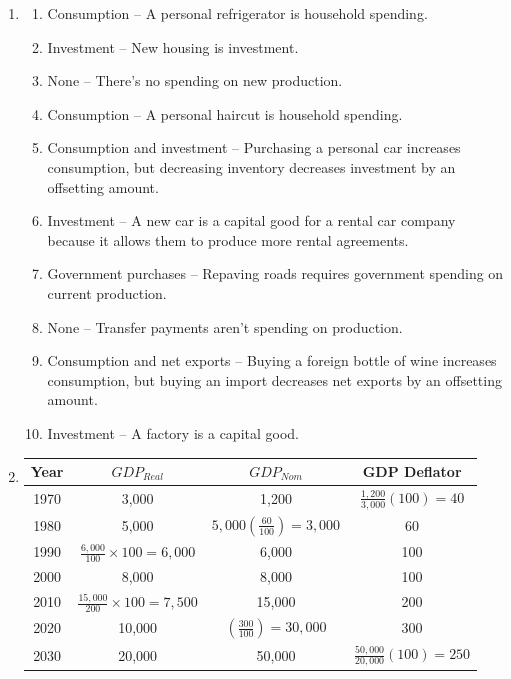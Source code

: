 \documentclass{article}
\begin{document}
\begin{enumerate}

\item

	\begin{enumerate}
	
	\item Consumption -- A personal refrigerator is household spending.
	
	\item Investment -- New housing is investment.
	
	\item None -- There's no spending on new production.
	
	\item Consumption -- A personal haircut is household spending.
	
	\item Consumption and investment -- Purchasing a personal car increases consumption, but decreasing inventory decreases investment by an offsetting amount.
	
	\item Investment -- A new car is a capital good for a rental car company because it allows them to produce more rental agreements.
	
	\item Government purchases -- Repaving roads requires government spending on current production.
	
	\item None -- Transfer payments aren't spending on production. 
	
	\item Consumption and net exports -- Buying a foreign bottle of wine increases consumption, but buying an import decreases net exports by an offsetting amount.
	
	\item Investment -- A factory is a capital good. 
	
	\end{enumerate}
	
\item \phantom{x}

	\begin{center}
	\begin{tabular}{| c | c | c | c |}
	\hline
	Year & $GDP_{Real}$ & $GDP_{Nom}$ & GDP Deflator \\
	\hline
	1970 & 3,000 & 1,200 & $\frac{1,200}{3,000}(100) = 40$ \\
	\hline
	1980 & 5,000 & $5,000 \left( \frac{60}{100} \right) = 3,000$ & 60 \\
	\hline
	1990 & $\frac{6,000}{100} \times 100 = 6,000$ & 6,000 & 100 \\
	\hline
	2000 & 8,000 & 8,000 & 100 \\
	\hline
	2010 & $\frac{15,000}{200} \times 100 = 7,500$ & 15,000 & 200 \\
	\hline
	2020 & 10,000 & $\left( \frac{300}{100} \right) = 30,000$ & 300 \\
	\hline
	2030 & 20,000 & 50,000 & $\frac{50,000}{20,000}(100) = 250$ \\
	\hline
	\end{tabular}
	\end{center}
	

\end{enumerate}
\end{document}
